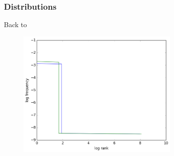 \documentclass{beamer}
\begin{document}
\begin{frame}
	\frametitle{Distributions}
	\small Back to \hyperlink{Dists}{}
	\begin{figure}
		\includegraphics[width=8cm]{2_random_exact_dists_plot}
	\end{figure}
\end{frame}
\end{document}

